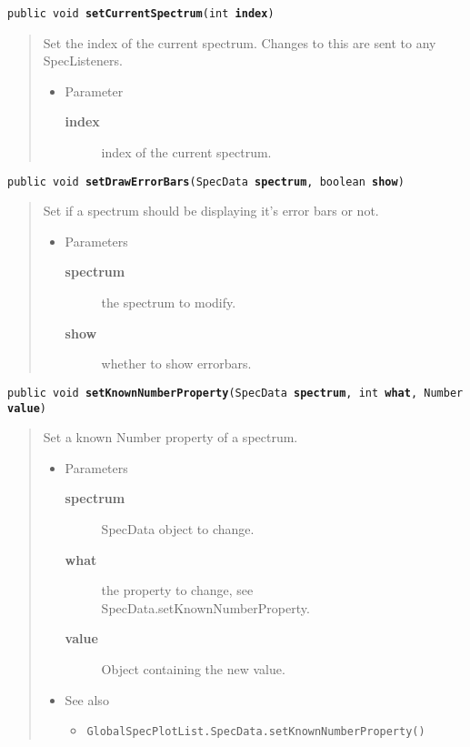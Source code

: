 \documentclass[twoside,11pt,nolof]{starlink}
\providecommand{\refdefined}[1]{}
\providecommand{\method}[1]{\texttt{#1}}
\newenvironment{desc}{\begin{quote}}{\end{quote}}
\begin{document}
\method{public void \textbf{setCurrentSpectrum}(\texttt{int} \textbf{index})\label{l323}\label{l324}}
\begin{desc}Set the index of the current spectrum. Changes to this are
 sent to any SpecListeners.
\begin{itemize}
\item{Parameter
  \begin{description}
   \item[\textbf{index}]{index of the current spectrum.}
  \end{description}}
\end{itemize}
\end{desc}

\method{public void \textbf{setDrawErrorBars}(\texttt{SpecData} \textbf{spectrum}, \texttt{boolean} \textbf{show})\label{l325}\label{l326}}
\begin{desc}Set if a spectrum should be displaying it's error bars or
  not.
\begin{itemize}
\item{Parameters
  \begin{description}
   \item[\textbf{spectrum}]{the spectrum to modify.}
   \item[\textbf{show}]{whether to show errorbars.}
  \end{description}}
\end{itemize}
\end{desc}

\method{public void \textbf{setKnownNumberProperty}(\texttt{SpecData} \textbf{spectrum}, \texttt{int} \textbf{what}, \texttt{Number} \textbf{value})\label{l327}\label{l328}}
\begin{desc}Set a known Number property of a spectrum.
\begin{itemize}
\item{Parameters
  \begin{description}
   \item[\textbf{spectrum}]{SpecData object to change.}
   \item[\textbf{what}]{the property to change, see
               SpecData.setKnownNumberProperty.}
   \item[\textbf{value}]{Object containing the new value.}
  \end{description}}
\end{itemize}
\begin{itemize}
\item{{See also}
  \begin{itemize}
   \item{\texttt{GlobalSpecPlotList.SpecData.setKnownNumberProperty()} {
\refdefined{l329}}
}
  \end{itemize}
}
\end{itemize}
\end{desc}
\end{document}
